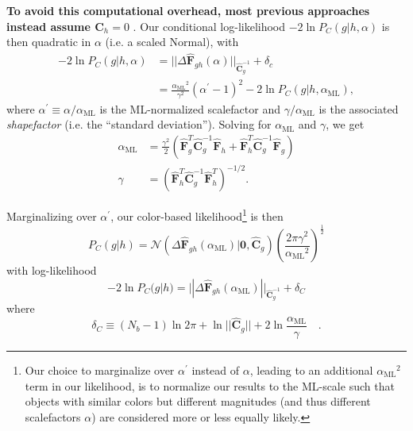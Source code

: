 \documentclass[a4paper,fleqn,usenatbib,english]{mnras}
\newcommand{\rom}[2]{\ensuremath{#1_{\mathrm{#2}}}} %
\begin{document}
\textbf{To avoid this computational overhead, most previous approaches instead assume $\mathbf{\hat{C}}_h=0$} \citep[e.g.,][]{ilbert+06,brammer+08,sawicki12,speagleeisenstein15a,speagleeisenstein15b}. Our conditional log-likelihood $-2 \ln P_C(g|h,\alpha)$ is then quadratic in $\alpha$ (i.e. a scaled Normal), with
\begin{align}
-2 \ln P_C(g|h,\alpha) &= ||\Delta\mathbf{\hat{F}}_{gh}(\alpha)||_{\mathbf{\hat{C}}_g^{-1}} + \delta_c \\
&=\frac{\rom{\alpha}{ML}^2}{\gamma^2} (\alpha^\prime-1)^2 - 2\ln P_C(g|h,\rom{\alpha}{ML}),
\end{align}
where $\alpha^\prime\equiv\alpha/\rom{\alpha}{ML}$ is the ML-normalized scalefactor and $\gamma/\rom{\alpha}{ML}$ is the associated \textit{shapefactor} (i.e. the ``standard deviation''). Solving for $\rom{\alpha}{ML}$ and $\gamma$, we get
\begin{align}
\rom{\alpha}{ML}&=\frac{\gamma^2}{2}\left(\mathbf{\hat{F}}_g^T\mathbf{\hat{C}}_g^{-1}\mathbf{\hat{F}}_h + \mathbf{\hat{F}}_h^T \mathbf{\hat{C}}_g^{-1} \mathbf{\hat{F}}_g\right) \label{eq:chi2_s_ml} \\
\gamma &= \left(\mathbf{\hat{F}}_h^T\mathbf{\hat{C}}_g^{-1}\mathbf{\hat{F}}_h^T\right)^{-1/2}.
\end{align}

Marginalizing over $\alpha^\prime$, our color-based likelihood\footnote{Our choice to marginalize over $\alpha^\prime$ instead of $\alpha$, leading to an additional $\rom{\alpha}{ML}^2$ term in our likelihood, is to normalize our results to the ML-scale such that objects with similar colors but different magnitudes (and thus different scalefactors $\alpha$) are considered more or less equally likely.} is then
\begin{equation}\label{eq:likelihood_scaled_pdf_model_mod}
P_C(g|h)=\mathcal{N}(\Delta\mathbf{\hat{F}}_{gh}(\rom{\alpha}{ML})|\mathbf{0},\mathbf{\hat{C}}_g)\left(\frac{2\pi\gamma^2}{\rom{\alpha}{ML}^2}\right)^{\frac{1}{2}}
\end{equation}
with log-likelihood
\begin{equation}
\boxed{
-2 \ln P_C(g|h) = ||\Delta\mathbf{\hat{F}}_{gh}(\rom{\alpha}{ML})||_{\mathbf{\hat{C}}_g^{-1}} + \delta_C
}
\end{equation}
where
\begin{equation}
\delta_C \equiv (N_b-1)\ln 2\pi + \ln||\mathbf{\hat{C}}_g|| + 2\ln \frac{\rom{\alpha}{ML}}{\gamma} \quad .
\end{equation}
\end{document}
